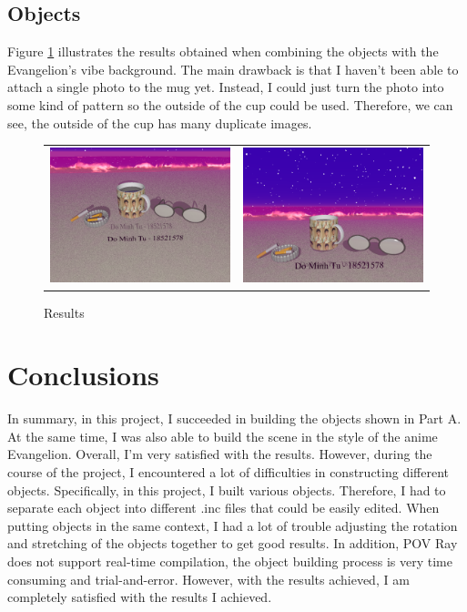 \documentclass[runningheads]{llncs}
\begin{document}
    \subsection{Objects}
    Figure \ref{fig:res} illustrates the results obtained when combining the objects with the Evangelion's vibe background. The main drawback is that I haven't been able to attach a single photo to the mug yet. Instead, I could just turn the photo into some kind of pattern so the outside of the cup could be used. Therefore, we can see, the outside of the cup has many duplicate images.
    \begin{figure}[!ht]
        \centering
        \begin{tabular}{c c}
            \includegraphics[width=.45\textwidth]{assets/mug.png} & 
            \includegraphics[width=.45\textwidth]{assets/mug1.png} \\
        \end{tabular}
        \caption{Results}
        \label{fig:res}
        \end{figure}   
    
    \section{Conclusions}
    In summary, in this project, I succeeded in building the objects shown in Part A. At the same time, I was also able to build the scene in the style of the anime Evangelion. Overall, I'm very satisfied with the results. However, during the course of the project, I encountered a lot of difficulties in constructing different objects. Specifically, in this project, I built various objects. Therefore, I had to separate each object into different .inc files that could be easily edited. When putting objects in the same context, I had a lot of trouble adjusting the rotation and stretching of the objects together to get good results. In addition, POV Ray does not support real-time compilation, the object building process is very time consuming and trial-and-error. However, with the results achieved, I am completely satisfied with the results I achieved.
    
    
    
\end{document}
